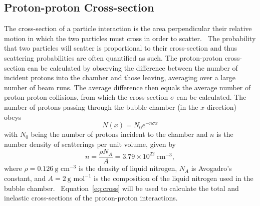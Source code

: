 \documentclass[twocolumn]{article}
\begin{document}
\subsection{Proton-proton Cross-section}
The cross-section of a particle interaction is the area perpendicular their relative motion in which the two particles must cross in order to scatter.~\cite{Thompson} The probability that two particles will scatter is proportional to their cross-section and thus scattering probabilities are often quantified as such. The proton-proton cross-section can be calculated by observing the difference between the number of incident protons into the chamber and those leaving, averaging over a large number of beam runs. The average difference then equals the average number of proton-proton collisions, from which the cross-section $\sigma$ can be calculated. The number of protons passing through the bubble chamber (in the $x$-direction) obeys~\cite{seul}
\begin{equation} \label{eq:cross}
N(x) = N_0 e^{-n \sigma x}
\end{equation}
with $N_0$ being the number of protons incident to the chamber and $n$ is the number density of scatterings per unit volume, given by
\begin{equation*}
n = \frac {\rho N_A} {A} = 3.79 \times 10^{22} ~\text{cm}^{-3},
\end{equation*}
where $\rho=0.126 ~\text{g cm}^{-3}$ is the density of liquid nitrogen, $N_A$ is Avogadro's constant, and $A=2 ~\text{g mol}^{-1}$ is the composition of the liquid nitrogen used in the bubble chamber.~\cite{harigel} Equation~\ref{eq:cross} will be used to calculate the total and inelastic cross-sections of the proton-proton interactions.
\end{document}
